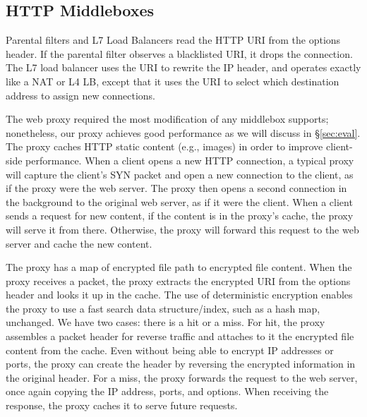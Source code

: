 \subsection{HTTP Middleboxes}
Parental filters and L7 Load Balancers read the HTTP URI from the options header. 
If the parental filter observes a blacklisted URI, it drops the connection.
The L7 load balancer uses the URI to rewrite the IP header, and operates exactly like a NAT or L4 LB, except that it uses the URI to select which destination address to assign new connections.

The web proxy required the most modification of any middlebox \sys supports; nonetheless, our proxy achieves good performance as we will discuss in \S\ref{sec:eval}.
The proxy  caches HTTP static content (e.g., images) in order to improve client-side performance. 
When a client opens a new HTTP connection, a typical proxy will capture the client's SYN packet and open a new connection to the client, as if the proxy were the web server. The proxy then opens a second connection in the background to the original web server, as if it were the client. 
When a client sends a request for new content, if the content is in the proxy's cache, the proxy will serve it from there. Otherwise, the proxy will forward this request to the web server and cache the new content. 

The proxy has a map of encrypted file path to encrypted file content. When the proxy receives a packet, the proxy extracts the encrypted URI from the options header and looks it up in the cache. The use of deterministic encryption enables the proxy to use a fast search data structure/index, such as a hash map, unchanged. We have two cases: there is a hit or a miss. For hit, the proxy assembles a packet header for reverse traffic and attaches to it the encrypted file content from the cache. Even without being able to encrypt IP addresses or ports, the proxy can create the header by reversing the encrypted information in the original header.
For a miss, the proxy forwards the request to the web server, once again copying the IP address, ports, and options. When receiving the response, the proxy caches it to serve future requests.



